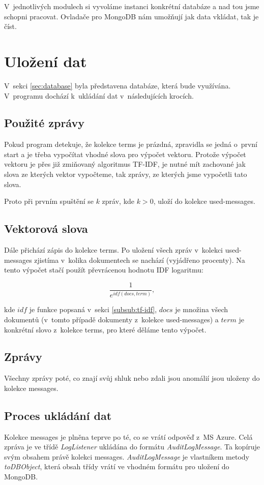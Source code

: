 \documentclass[thesis=M,czech]{FITthesis}[2012/10/20]
\begin{document}
		V~jednotlivých modulech si vyvoláme instanci konkrétní databáze a nad tou jsme schopni pracovat. Ovladače pro MongoDB nám umožňují jak data vkládat, tak je číst.

	\section{Uložení dat}
		V~sekci \ref{sec:database} byla představena databáze, která bude využívána. V~programu dochází k~ukládání dat v~následujících krocích.
		
		\subsection{Použité zprávy}
			Pokud program detekuje, že kolekce terms je prázdná, zpravidla se jedná o~první start a je třeba vypočítat vhodné slova pro výpočet vektoru. Protože výpočet vektoru je přes již zmiňovaný algoritmus TF-IDF, je nutné mít zachované jak slova ze kterých vektor vypočteme, tak zprávy, ze kterých jsme vypočetli tato slova. 
			
			Proto při prvním spuštění se $k$ zpráv, kde $k > 0$, uloží do kolekce used-messages.
			
		\subsection{Vektorová slova}
			Dále přichází zápis do kolekce terms. Po uložení všech zpráv v~kolekci used-messages zjistíma v~kolika dokumentech se nachází (vyjádřeno procenty). Na tento výpočet stačí použít převrácenou hodnotu IDF  logaritmu:
			
			$$\frac{1}{e^{idf(docs,term)}},$$
			
			kde $idf$ je funkce popsaná v~sekci \ref{subsub:tf-idf}, $docs$ je množina všech dokumentů (v~tomto případě dokumenty z~kolekce used-messages) a $term$ je konkrétní slovo z~kolekce terms, pro které děláme tento výpočet.
			
		\subsection{Zprávy}
			Všechny zprávy poté, co znají svůj shluk nebo zdali jsou anomálií jsou uloženy do kolekce messages. 
		
		\subsection{Proces ukládání dat}
			Kolekce messages je plněna teprve po té, co se vrátí odpověď z~MS Azure. Celá zpráva je ve třídě \textit{LogListener} ukládána do formátu \textit{AuditLogMessage}. Ta kopíruje svým obsahem právě kolekci messages. \textit{AuditLogMessage} je vlastníkem metody \textit{toDBObject}, která obsah třídy vrátí ve vhodném formátu pro uložení do MongoDB.
			
\end{document}
